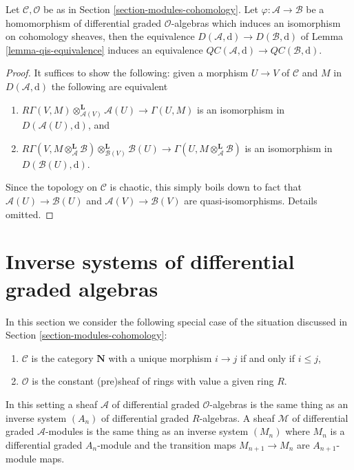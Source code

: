 \begin{lemma}
\label{lemma-cartesian-qis-equivalence}
Let $\mathcal{C}, \mathcal{O}$ be as in
Section \ref{section-modules-cohomology}. Let
$\varphi : \mathcal{A} \to \mathcal{B}$ be a homomorphism of
differential graded $\mathcal{O}$-algebras which induces an
isomorphism on cohomology sheaves, then the equivalence
$D(\mathcal{A}, \text{d}) \to D(\mathcal{B}, \text{d})$
of Lemma \ref{lemma-qis-equivalence} induces an equivalence
$\mathit{QC}(\mathcal{A}, \text{d}) \to
\mathit{QC}(\mathcal{B}, \text{d})$.
\end{lemma}

\begin{proof}
It suffices to show the following: given a morphism $U \to V$ of $\mathcal{C}$
and $M$ in $D(\mathcal{A}, \text{d})$ the following are equivalent
\begin{enumerate}
\item $R\Gamma(V, M) \otimes_{\mathcal{A}(V)}^\mathbf{L} \mathcal{A}(U)
\to \Gamma(U, M)$ is an isomorphism in $D(\mathcal{A}(U), \text{d})$, and
\item $R\Gamma(V, M \otimes_\mathcal{A}^\mathbf{L} \mathcal{B})
\otimes_{\mathcal{B}(V)}^\mathbf{L} \mathcal{B}(U)
\to \Gamma(U, M \otimes_\mathcal{A}^\mathbf{L} \mathcal{B})$
is an isomorphism in $D(\mathcal{B}(U), \text{d})$.
\end{enumerate}
Since the topology on $\mathcal{C}$ is chaotic, this simply boils down
to fact that $\mathcal{A}(U) \to \mathcal{B}(U)$ and
$\mathcal{A}(V) \to \mathcal{B}(V)$ are quasi-isomorphisms.
Details omitted.
\end{proof}






\section{Inverse systems of differential graded algebras}
\label{section-qc-inverse-system}

\noindent
In this section we consider the following special case of the situation
discussed in Section \ref{section-modules-cohomology}:
\begin{enumerate}
\item $\mathcal{C}$ is the category $\mathbf{N}$
with a unique morphism $i \to j$ if and only if $i \leq j$,
\item $\mathcal{O}$ is the constant (pre)sheaf of rings with value
a given ring $R$.
\end{enumerate}
In this setting a sheaf $\mathcal{A}$ of differential graded
$\mathcal{O}$-algebras is the same thing as an inverse system
$(A_n)$ of differential graded $R$-algebras.
A sheaf $\mathcal{M}$ of differential graded $\mathcal{A}$-modules
is the same thing as an inverse system $(M_n)$ where $M_n$ is
a differential graded $A_n$-module and the transition maps
$M_{n + 1} \to M_n$ are $A_{n + 1}$-module maps.

